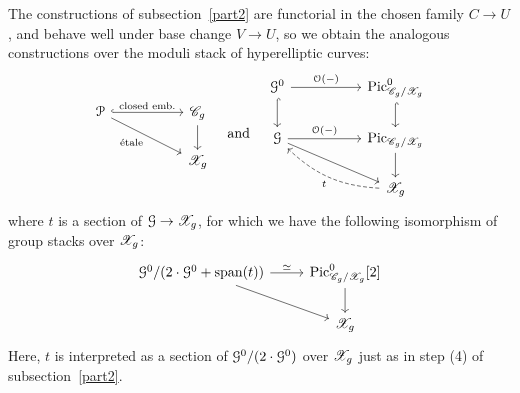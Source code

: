 The constructions of subsection~\ref{part2} are functorial in the chosen family $C \to U$, and behave well under base change $V \to U$, so we obtain the analogous constructions over the moduli stack of hyperelliptic curves:
\[
\begin{tikzcd}[column sep = 0.7in]
\mc{P} \ar[hookrightarrow]{r}{\text{closed emb.}} \ar[swap]{rd}{\text{\'etale}} & \hyperellSource_g \ar{d} \\
& \hyperell_g
\end{tikzcd}
\quad \text{and} \quad
\begin{tikzcd}[column sep = 0.7in]
\mc{G}^0 \ar{r}{\mc{O}(-)} \ar[hookrightarrow]{d} & \on{Pic}^0_{\hyperellSource_g/\hyperell_g} \ar[hookrightarrow]{d} \\
\mc{G} \ar{r}{\mc{O}(-)} \ar{dr} & \on{Pic}_{\hyperellSource_g/\hyperell_g} \ar{d} \\
& \hyperell_g \ar[dashed, bend left = 20]{ul}{t}
\end{tikzcd}
\]
where $t$ is a section of $\mathcal{G} \to \mathscr{X}_g$, for which we have the following isomorphism of group stacks over $\mathscr{X}_g$:
\[
\begin{tikzcd}
\mc{G}^0/(2 \cdot \mc{G}^0 + \on{span}(t)) \ar{r}{\simeq} \ar{dr} & \on{Pic}^0_{\hyperellSource_g/\hyperell_g}[2] \ar{d} \\
& \hyperell_g
\end{tikzcd}
\]
Here, $t$ is interpreted as a section of $\mathcal{G}^0 / (2 \cdot \mathcal{G}^0)$ over $\mathscr{X}_g$ just as in step (4) of subsection~\ref{part2}.


